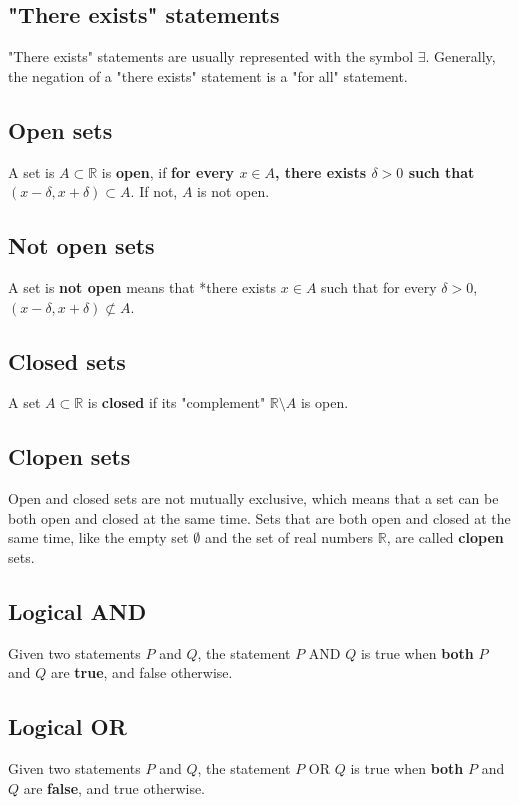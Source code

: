 \documentclass[11pt]{article}
\begin{document}
\subsection{"There exists" statements}
\label{sec:org4371ef8}
"There exists" statements are usually represented with the symbol \(\exists\). Generally, the negation of a "there exists" statement is a "for all" statement.

\subsection{Open sets}
\label{sec:orgecb2e67}
A set is \(A \subset \mathbb{R}\) is \textbf{open}, if \textbf{for every \(x \in A\), there exists \(\delta > 0\) such that \((x - \delta, x + \delta) \subset A\)}. If not, \(A\) is not open.

\subsection{Not open sets}
\label{sec:orgfc243aa}
A set is \textbf{not open} means that *there exists \(x \in A\) such that for every \(\delta > 0\), \((x - \delta, x + \delta) \not\subset A\).

\subsection{Closed sets}
\label{sec:org89df035}
A set \(A \subset \mathbb{R}\) is \textbf{closed} if its "complement" \(\mathbb{R} \setminus A\) is open.

\subsection{Clopen sets}
\label{sec:orga26804f}
Open and closed sets are not mutually exclusive, which means that a set can be both open and closed at the same time. Sets that are both open and closed at the same time, like the empty set \(\emptyset\) and the set of real numbers \(\mathbb{R}\), are called \textbf{clopen} sets.

\subsection{Logical AND}
\label{sec:org088fb43}
Given two statements \(P\) and \(Q\), the statement \(P\) AND \(Q\) is true when \textbf{both} \(P\) and \(Q\) are \textbf{true}, and false otherwise.

\subsection{Logical OR}
\label{sec:org5102011}
Given two statements \(P\) and \(Q\), the statement \(P\) OR \(Q\) is true when \textbf{both} \(P\) and \(Q\) are \textbf{false}, and true otherwise.
\end{document}
